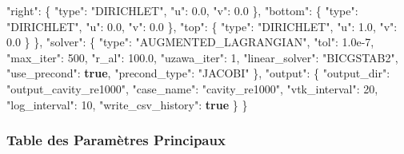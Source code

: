 \documentclass[
  french,
]{article}
\newenvironment{Shaded}{}{}
\newcommand{\DataTypeTok}[1]{\textcolor[rgb]{0.56,0.13,0.00}{#1}}
\newcommand{\DecValTok}[1]{\textcolor[rgb]{0.25,0.63,0.44}{#1}}
\newcommand{\FloatTok}[1]{\textcolor[rgb]{0.25,0.63,0.44}{#1}}
\newcommand{\FunctionTok}[1]{\textcolor[rgb]{0.02,0.16,0.49}{#1}}
\newcommand{\KeywordTok}[1]{\textcolor[rgb]{0.00,0.44,0.13}{\textbf{#1}}}
\newcommand{\StringTok}[1]{\textcolor[rgb]{0.25,0.44,0.63}{#1}}
\begin{document}
\begin{Shaded}
\begin{Highlighting}[]
    \DataTypeTok{"right"}\FunctionTok{:}  \FunctionTok{\{} \DataTypeTok{"type"}\FunctionTok{:} \StringTok{"DIRICHLET"}\FunctionTok{,} \DataTypeTok{"u"}\FunctionTok{:} \FloatTok{0.0}\FunctionTok{,} \DataTypeTok{"v"}\FunctionTok{:} \FloatTok{0.0} \FunctionTok{\},}
    \DataTypeTok{"bottom"}\FunctionTok{:} \FunctionTok{\{} \DataTypeTok{"type"}\FunctionTok{:} \StringTok{"DIRICHLET"}\FunctionTok{,} \DataTypeTok{"u"}\FunctionTok{:} \FloatTok{0.0}\FunctionTok{,} \DataTypeTok{"v"}\FunctionTok{:} \FloatTok{0.0} \FunctionTok{\},}
    \DataTypeTok{"top"}\FunctionTok{:}    \FunctionTok{\{} \DataTypeTok{"type"}\FunctionTok{:} \StringTok{"DIRICHLET"}\FunctionTok{,} \DataTypeTok{"u"}\FunctionTok{:} \FloatTok{1.0}\FunctionTok{,} \DataTypeTok{"v"}\FunctionTok{:} \FloatTok{0.0} \FunctionTok{\}}
  \FunctionTok{\},}
  \DataTypeTok{"solver"}\FunctionTok{:} \FunctionTok{\{}
    \DataTypeTok{"type"}\FunctionTok{:} \StringTok{"AUGMENTED\_LAGRANGIAN"}\FunctionTok{,}
    \DataTypeTok{"tol"}\FunctionTok{:} \FloatTok{1.0e{-}7}\FunctionTok{,}
    \DataTypeTok{"max\_iter"}\FunctionTok{:} \DecValTok{500}\FunctionTok{,}
    \DataTypeTok{"r\_al"}\FunctionTok{:} \FloatTok{100.0}\FunctionTok{,}
    \DataTypeTok{"uzawa\_iter"}\FunctionTok{:} \DecValTok{1}\FunctionTok{,}
    \DataTypeTok{"linear\_solver"}\FunctionTok{:} \StringTok{"BICGSTAB2"}\FunctionTok{,}
    \DataTypeTok{"use\_precond"}\FunctionTok{:} \KeywordTok{true}\FunctionTok{,}
    \DataTypeTok{"precond\_type"}\FunctionTok{:} \StringTok{"JACOBI"}
  \FunctionTok{\},}
  \DataTypeTok{"output"}\FunctionTok{:} \FunctionTok{\{}
    \DataTypeTok{"output\_dir"}\FunctionTok{:} \StringTok{"output\_cavity\_re1000"}\FunctionTok{,}
    \DataTypeTok{"case\_name"}\FunctionTok{:} \StringTok{"cavity\_re1000"}\FunctionTok{,}
    \DataTypeTok{"vtk\_interval"}\FunctionTok{:} \DecValTok{20}\FunctionTok{,}
    \DataTypeTok{"log\_interval"}\FunctionTok{:} \DecValTok{10}\FunctionTok{,}
    \DataTypeTok{"write\_csv\_history"}\FunctionTok{:} \KeywordTok{true}
  \FunctionTok{\}}
\FunctionTok{\}}
\end{Highlighting}
\end{Shaded}

\subsubsection{Table des Paramètres
Principaux}\label{table-des-paramuxe8tres-principaux}
\end{document}
